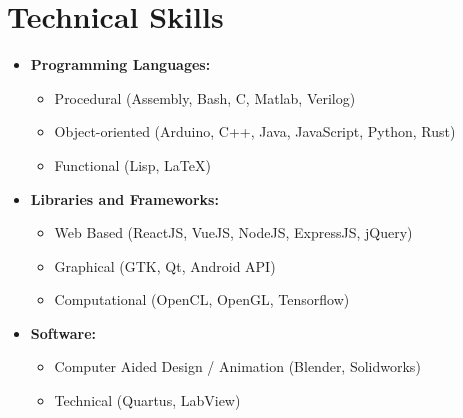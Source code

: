 \documentclass[10pt,letterpaper,sans]{moderncv}
\begin{document}
\section{Technical Skills}
\begin{itemize}
\item \textbf{Programming Languages:}
  \begin{itemize}
    \item Procedural (Assembly, Bash, C, Matlab, Verilog)
    \item Object-oriented (Arduino, C++, Java, JavaScript, Python, Rust)
    \item Functional (Lisp, \LaTeX)
  \end{itemize}
\item \textbf{Libraries and Frameworks:} 
  \begin{itemize}
  \item Web Based (ReactJS, VueJS, NodeJS, ExpressJS, jQuery)
  \item Graphical (GTK, Qt, Android API)
  \item Computational (OpenCL, OpenGL, Tensorflow)
  \end{itemize}
\item \textbf{Software:} 
  \begin{itemize}
  \item Computer Aided Design / Animation (Blender, Solidworks)
  \item Technical (Quartus, LabView)
  \end{itemize}
\end{itemize}
\end{document}
